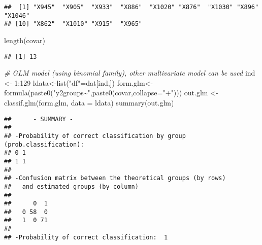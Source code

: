\documentclass[
]{book}
\newenvironment{Shaded}{\begin{snugshade}}{\end{snugshade}}
\newcommand{\AttributeTok}[1]{\textcolor[rgb]{0.77,0.63,0.00}{#1}}
\newcommand{\CommentTok}[1]{\textcolor[rgb]{0.56,0.35,0.01}{\textit{#1}}}
\newcommand{\DecValTok}[1]{\textcolor[rgb]{0.00,0.00,0.81}{#1}}
\newcommand{\FunctionTok}[1]{\textcolor[rgb]{0.00,0.00,0.00}{#1}}
\newcommand{\NormalTok}[1]{#1}
\newcommand{\OtherTok}[1]{\textcolor[rgb]{0.56,0.35,0.01}{#1}}
\newcommand{\SpecialCharTok}[1]{\textcolor[rgb]{0.00,0.00,0.00}{#1}}
\newcommand{\StringTok}[1]{\textcolor[rgb]{0.31,0.60,0.02}{#1}}
\begin{document}
\begin{verbatim}
##  [1] "X945"  "X905"  "X933"  "X886"  "X1020" "X876"  "X1030" "X896"  "X1046"
## [10] "X862"  "X1010" "X915"  "X965"
\end{verbatim}

\begin{Shaded}
\begin{Highlighting}[]
\FunctionTok{length}\NormalTok{(covar)}
\end{Highlighting}
\end{Shaded}

\begin{verbatim}
## [1] 13
\end{verbatim}

\begin{Shaded}
\begin{Highlighting}[]
\CommentTok{\# GLM model (using binomial family), other multivariate model can be used}
\NormalTok{ind }\OtherTok{\textless{}{-}} \DecValTok{1}\SpecialCharTok{:}\DecValTok{129}
\NormalTok{ldata}\OtherTok{\textless{}{-}}\FunctionTok{list}\NormalTok{(}\StringTok{"df"}\OtherTok{=}\NormalTok{dat[ind,])}
\NormalTok{form.glm}\OtherTok{\textless{}{-}}\FunctionTok{formula}\NormalTok{(}\FunctionTok{paste0}\NormalTok{(}\StringTok{"y2groups\textasciitilde{}"}\NormalTok{,}\FunctionTok{paste0}\NormalTok{(covar,}\AttributeTok{collapse=}\StringTok{"+"}\NormalTok{)))}
\NormalTok{out.glm  }\OtherTok{\textless{}{-}} \FunctionTok{classif.glm}\NormalTok{(form.glm, }\AttributeTok{data =}\NormalTok{ ldata)}
\FunctionTok{summary}\NormalTok{(out.glm)}
\end{Highlighting}
\end{Shaded}

\begin{verbatim}
##      - SUMMARY - 
## 
## -Probability of correct classification by group (prob.classification):
## 0 1 
## 1 1 
## 
## -Confusion matrix between the theoretical groups (by rows)
##   and estimated groups (by column) 
##    
##      0  1
##   0 58  0
##   1  0 71
## 
## -Probability of correct classification:  1
\end{verbatim}

\begin{Shaded}
\end{Shaded}
\end{document}
